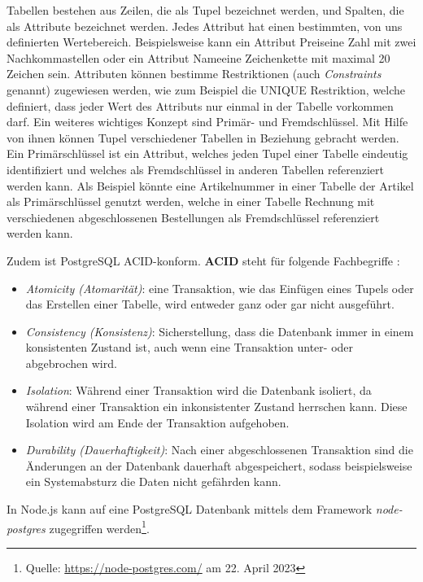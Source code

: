Tabellen bestehen aus Zeilen, die als Tupel bezeichnet werden, und Spalten, die als Attribute bezeichnet werden. Jedes Attribut hat einen bestimmten, von uns definierten Wertebereich. Beispielsweise kann ein Attribut \glqq Preis\grqq{ }eine Zahl mit zwei Nachkommastellen oder ein Attribut \glqq Name\grqq{ }eine Zeichenkette mit maximal 20 Zeichen sein.  Attributen können bestimme Restriktionen (auch \textit{Constraints} genannt) zugewiesen werden, wie zum Beispiel die UNIQUE Restriktion, welche definiert, dass jeder Wert des Attributs nur einmal in der Tabelle vorkommen darf.
Ein weiteres wichtiges Konzept sind Primär- und Fremdschlüssel. Mit Hilfe von ihnen können Tupel verschiedener Tabellen in Beziehung gebracht werden. Ein Primärschlüssel ist ein Attribut, welches jeden Tupel einer Tabelle eindeutig identifiziert und welches als Fremdschlüssel in anderen Tabellen referenziert werden kann. Als Beispiel könnte eine Artikelnummer in einer Tabelle der Artikel als Primärschlüssel genutzt werden, welche in einer Tabelle Rechnung mit verschiedenen abgeschlossenen Bestellungen als Fremdschlüssel referenziert werden kann.

Zudem ist PostgreSQL ACID-konform. \textbf{ACID} steht für folgende Fachbegriffe \cite{sql-book}:
\begin{itemize}
 \item \textit{Atomicity (Atomarität)}: eine Transaktion, wie das Einfügen eines Tupels oder das Erstellen einer Tabelle, wird entweder ganz oder gar nicht ausgeführt.
 \item \textit{Consistency (Konsistenz)}: Sicherstellung, dass die Datenbank immer in einem konsistenten Zustand ist, auch wenn eine Transaktion unter- oder abgebrochen wird.
 \item \textit{Isolation}: Während einer Transaktion wird die Datenbank isoliert, da während einer Transaktion ein inkonsistenter Zustand herrschen kann. Diese Isolation wird am Ende der Transaktion aufgehoben.
  \item \textit{Durability (Dauerhaftigkeit)}: Nach einer abgeschlossenen Transaktion sind die Änderungen an der Datenbank dauerhaft abgespeichert, sodass beispielsweise ein Systemabsturz die Daten nicht gefährden kann.
\end{itemize}

In Node.js kann auf eine PostgreSQL Datenbank mittels dem Framework \textit{node-postgres} zugegriffen werden\footnote{Quelle: \url{https://node-postgres.com/} am 22. April 2023}.
